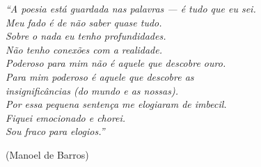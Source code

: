 


\begin{epigrafe}

\textit{``A poesia está guardada nas palavras — é tudo que eu sei.\\
Meu fado é de não saber quase tudo.\\
Sobre o nada eu tenho profundidades.\\
Não tenho conexões com a realidade.\\
Poderoso para mim não é aquele que descobre ouro.\\
Para mim poderoso é aquele que descobre as\\
insignificâncias (do mundo e as nossas).\\
Por essa pequena sentença me elogiaram de imbecil.\\
Fiquei emocionado e chorei.\\
Sou fraco para elogios.''}

(Manoel de Barros)
\end{epigrafe}



